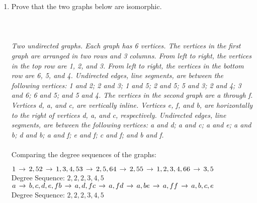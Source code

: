 \documentclass{amsart}
\theoremstyle{definition}
\theoremstyle{Exercise}
\theoremstyle{remark}
\theoremstyle{rule}
\numberwithin{equation}{section}
\begin{document}
\begin{enumerate}[label=(\alph*)]
 \
\vspace*{0.25in}
\item Prove that the two graphs below are isomorphic.\\\\
   \\\\
 {\color{blue}{\bf Figure 4:} \emph{Two undirected graphs. Each graph has 6 vertices. The vertices in the first graph are arranged in two rows and 3 columns. From left to right, the vertices in the top row are 1, 2, and 3. From left to right, the vertices in the bottom row are 6, 5, and 4. Undirected edges, line segments, are between the following vertices: 1 and 2; 2 and 3; 1 and 5; 2 and 5; 5 and 3; 2 and 4; 3 and 6; 6 and 5; and 5 and 4. The vertices in the second graph are a through f. Vertices d, a, and c, are vertically inline. Vertices e, f, and b, are horizontally to the right of vertices d, a, and c, respectively. Undirected edges, line segments, are between the following vertices: a and d; a and c; a and e; a and b; d and b; a and f; e and f; c and f; and b and f.
}
}
\\\\
Comparing the degree sequences of the graphs:
\begin{multicols}{2}\noindent
    $1\, \rightarrow\, 2, 5\\
    2\, \rightarrow\, 1, 3, 4, 5\\
    3\, \rightarrow\, 2, 5, 6\\
    4\, \rightarrow\, 2, 5\\
    5\, \rightarrow\, 1, 2, 3, 4, 6\\
    6\, \rightarrow\, 3, 5$\\
    Degree Sequence: $2, 2, 2, 3, 4, 5$
\columnbreak\\
    $a\, \rightarrow\, b, c, d, e, f\\
    b\, \rightarrow\, a, d, f\\
    c\, \rightarrow\, a, f\\
    d\, \rightarrow\, a, b\\
    e\, \rightarrow\, a, f\\
    f\, \rightarrow\, a, b, c, e$\\
    Degree Sequence: $2, 2, 2, 3, 4, 5$
\end{multicols}


\end{enumerate}
\end{document}
